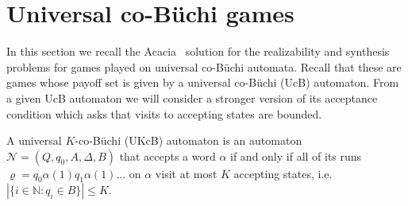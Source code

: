 \documentclass[runningheads,a4paper,draft]{llncs}
\let\rho\varrho
\newcommand{\st}{\mathrel{:}}
\newcommand{\ie}{i.e.\xspace}
\newcommand{\calN}{\mathcal{N}}
\begin{document}
\section{Universal co-B\"uchi games}
In this section we recall the Acacia~\cite{acacia} solution for the
realizability and synthesis problems for games played on universal co-B\"uchi
automata. Recall that these are games whose payoff set is given by a universal
co-B\"uchi (UcB) automaton.  From a given UcB automaton we will consider a
stronger version of its acceptance condition which asks that visits to
accepting states are bounded.

\begin{definition}
    A universal $K$-co-B\"uchi (UKcB) automaton is an automaton $\calN =
    (Q,q_0,A,\Delta,B)$ that accepts a word $\alpha$ if and only if all of its
    runs $\rho = q_0 \alpha(1) q_1 \alpha(1) \dots$
    on $\alpha$ visit at most $K$ accepting states, \ie~$|\{i \in \mathbb{N} \st
    q_i \in B\}| \le K$.
\end{definition}
\end{document}
